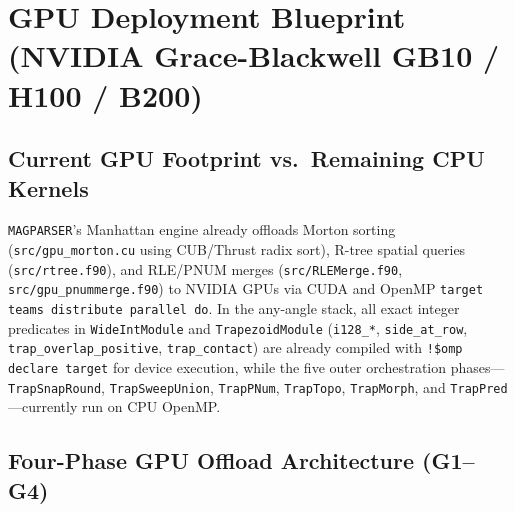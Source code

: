 \appendix
\chapter{GPU Deployment Blueprint (NVIDIA Grace-Blackwell GB10 / H100 / B200)}
\label{app:gpu}

\section{Current GPU Footprint vs.\ Remaining CPU Kernels}

\texttt{MAGPARSER}'s Manhattan engine already offloads Morton sorting (\texttt{src/gpu\_morton.cu} using CUB/Thrust radix sort), R-tree spatial queries (\texttt{src/rtree.f90}), and RLE/PNUM merges (\texttt{src/RLEMerge.f90}, \texttt{src/gpu\_pnummerge.f90}) to NVIDIA GPUs via CUDA and OpenMP \texttt{target teams distribute parallel do}. In the any-angle stack, all exact integer predicates in \texttt{WideIntModule} and \texttt{TrapezoidModule} (\texttt{i128\_*}, \texttt{side\_at\_row}, \texttt{trap\_overlap\_positive}, \texttt{trap\_contact}) are already compiled with \texttt{!\$omp declare target} for device execution, while the five outer orchestration phases---\texttt{TrapSnapRound}, \texttt{TrapSweepUnion}, \texttt{TrapPNum}, \texttt{TrapTopo}, \texttt{TrapMorph}, and \texttt{TrapPred}---currently run on CPU OpenMP.

\section{Four-Phase GPU Offload Architecture (G1--G4)}

